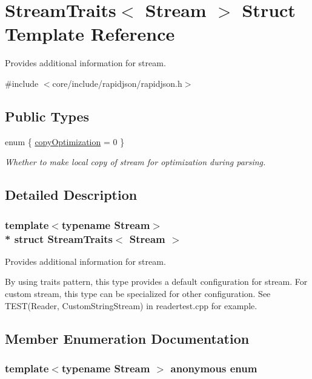\hypertarget{structStreamTraits}{}\section{Stream\+Traits$<$ Stream $>$ Struct Template Reference}
\label{structStreamTraits}


Provides additional information for stream.  




{\ttfamily \#include $<$core/include/rapidjson/rapidjson.\+h$>$}

\subsection*{Public Types}
\begin{DoxyCompactItemize}
\item 
enum \{ \hyperlink{structStreamTraits_a396e8fd5cbb7c0a9e4c1f509e4d490f5a0300ac4c098b0d59f43a0c4e1ec86eac}{copy\+Optimization} = 0
 \}\begin{DoxyCompactList}\small\item\em Whether to make local copy of stream for optimization during parsing. \end{DoxyCompactList}
\end{DoxyCompactItemize}


\subsection{Detailed Description}
\subsubsection*{template$<$typename Stream$>$\\*
struct Stream\+Traits$<$ Stream $>$}

Provides additional information for stream. 

By using traits pattern, this type provides a default configuration for stream. For custom stream, this type can be specialized for other configuration. See T\+E\+S\+T(\+Reader, Custom\+String\+Stream) in readertest.\+cpp for example. 

\subsection{Member Enumeration Documentation}
\subsubsection[{\texorpdfstring{anonymous enum}{anonymous enum}}]{\setlength{\rightskip}{0pt plus 5cm}template$<$typename Stream $>$ anonymous enum}\hypertarget{structStreamTraits_a396e8fd5cbb7c0a9e4c1f509e4d490f5}{}\label{structStreamTraits_a396e8fd5cbb7c0a9e4c1f509e4d490f5}


